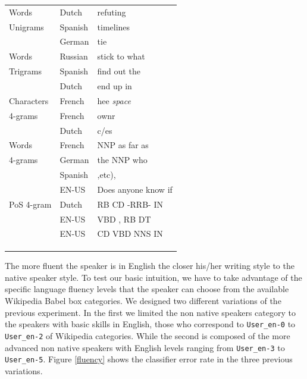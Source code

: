 \documentclass[10pt,a5paper,twoside]{article}
\begin{document}
\begin{table}[t]
\begin{center}
{\begin{tabular}{l|ll}
	Words &Dutch& refuting\\
	   Unigrams&Spanish&timelines\\
	    &German& tie\\\hline
	    
	Words 	&Russian& stick to what\\
	Trigrams&Spanish& find out the\\
	&Dutch& end up in\\\hline

        Characters &French& hee \emph{space}\\
	4-grams	&French&ownr\\
		&Dutch&c/es\\
	\hline

	Words &French& NNP as far as\\
	4-grams &German& the NNP who\\
	&Spanish& ,etc),\\
	&EN-US& Does anyone know if\\\hline
	
	PoS 4-gram &Dutch& RB CD -RRB- IN \\
	&EN-US& VBD , RB DT\\
	&EN-US& CD VBD NNS IN\\
	&& \\
	&& \\
	&& \\
\end{tabular}
\label{table:nonnative}}
\end{center}
\end{table}

The more fluent the speaker is in English the closer his/her writing
style to the native speaker style. To test our basic intuition,
we have to take advantage of the specific language fluency levels that the speaker can choose
from the available Wikipedia Babel box categories. We designed two different
variations of the previous experiment. In the first we limited
the non native speakers category to the speakers with basic skills in English,
those who correspond to \verb+User_en-0+ to \verb+User_en-2+ of Wikipedia categories.
While the second is composed of the more advanced non native speakers with
English levels ranging from \verb+User_en-3+ to \verb+User_en-5+.
Figure \ref{fluency} shows the classifier error rate in the three previous
variations.
\end{document}

